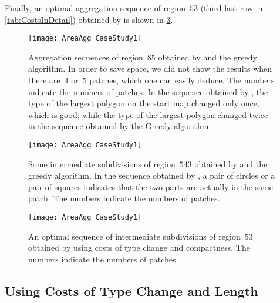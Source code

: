 Finally, an optimal aggregation sequence of region~$53$
(third-last row in \tab\ref{tab:CostsInDetail})
obtained by \AstarTwo
is shown in \fig\ref{fig:AreaAgg_CaseStudy1_Rg53}.

\begin{figure}[tb]
\centering
\texttt{[image: AreaAgg\_CaseStudy1]}
\caption{Aggregation sequences of region~$85$ 
	obtained by \Astar and the greedy algorithm.
	In order to save space, we did not show the results 
	when there are~$4$ or~$5$ patches, 
	which one can easily deduce.
	The numbers indicate the numbers of patches.
    In the sequence obtained by \Astar, 
    the type of the largest polygon on the start map 
    changed only once, which is good; 
    while the type of the largest polygon changed twice 
    in the sequence obtained by the Greedy algorithm.}
\label{fig:AreaAgg_CaseStudy1_Rg85}
\end{figure}

\begin{figure}[tb]
\centering
\texttt{[image: AreaAgg\_CaseStudy1]}
\caption{Some intermediate subdivisions of region~$543$ 
	obtained by \Astar and the greedy algorithm.
	In the sequence obtained by \Astar, 
	a pair of circles or a pair of squares indicates that
	the two parts are actually in the same patch.
	The numbers indicate the numbers of patches.
}
\label{fig:AreaAgg_CaseStudy1_Rg543}
\end{figure}


\begin{figure}[tb]
\centering
\texttt{[image: AreaAgg\_CaseStudy1]}
\caption{An optimal sequence of intermediate subdivisions 
	of region~$53$ obtained by \Astar 
	using costs of type change and compactness.		 
	The numbers indicate the numbers of patches.		
}
\label{fig:AreaAgg_CaseStudy1_Rg53}
\end{figure}






\subsection{Using Costs of Type Change and Length}
\label{sec:AreaAgg_CaseStudy2}

